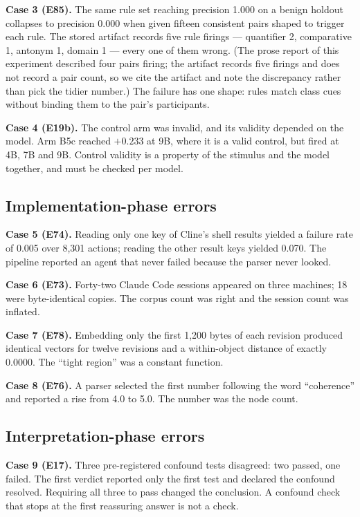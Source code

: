 \documentclass[11pt]{article}
\begin{document}
\textbf{Case 3 (E85).} The same rule set reaching precision 1.000 on a
benign holdout collapses to precision 0.000 when given fifteen consistent
pairs shaped to trigger each rule. The stored artifact records five rule
firings --- quantifier 2, comparative 1, antonym 1, domain 1 --- every one
of them wrong. (The prose report of this experiment described four pairs
firing; the artifact records five firings and does not record a pair count,
so we cite the artifact and note the discrepancy rather than pick the
tidier number.) The failure has one shape: rules match class cues without
binding them to the pair's participants.

\textbf{Case 4 (E19b).} The control arm was invalid, and its validity
depended on the model. Arm B5c reached $+0.233$ at 9B, where it is a valid
control, but fired at 4B, 7B and 9B. Control validity is a property of the
stimulus and the model together, and must be checked per model.

\subsection{Implementation-phase errors}

\textbf{Case 5 (E74).} Reading only one key of Cline's shell results
yielded a failure rate of 0.005 over 8,301 actions; reading the other
result keys yielded 0.070. The pipeline reported an agent that never failed
because the parser never looked.

\textbf{Case 6 (E73).} Forty-two Claude Code sessions appeared on three
machines; 18 were byte-identical copies. The corpus count was right and the
session count was inflated.

\textbf{Case 7 (E78).} Embedding only the first 1,200 bytes of each
revision produced identical vectors for twelve revisions and a within-object
distance of exactly 0.0000. The ``tight region'' was a constant function.

\textbf{Case 8 (E76).} A parser selected the first number following the
word ``coherence'' and reported a rise from 4.0 to 5.0. The number was the
node count.

\subsection{Interpretation-phase errors}

\textbf{Case 9 (E17).} Three pre-registered confound tests disagreed: two
passed, one failed. The first verdict reported only the first test and
declared the confound resolved. Requiring all three to pass changed the
conclusion. A confound check that stops at the first reassuring answer is
not a check.
\end{document}
